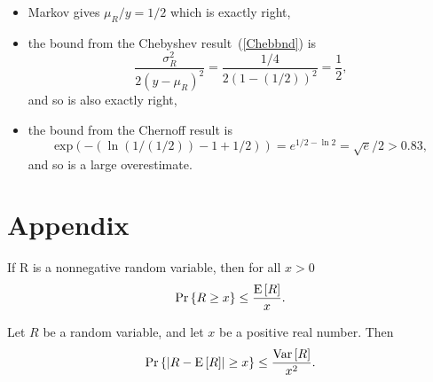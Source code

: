 \documentclass[10pt]{article}
\begin{document}
\begin{problem}
\begin{problemparts}
{\begin{itemize}
\item Markov gives $\mu_R/y = 1/2$ which is exactly right,

\item the bound from the Chebyshev result~(\ref{Chebbnd}) is
\[
\frac{\sigma_R^2}{2(y - \mu_R)^2} = \frac{1/4}{2(1-(1/2))^2} = \frac{1}{2},
\]
and so is also exactly right,

\item the bound from the Chernoff result is
\[
\text{exp}(- (\ln (1/(1/2)) - 1 + 1/2)) = e^{1/2 - \ln 2} = \sqrt{e}/2 > 0.83,
\]
and so is a large overestimate.

\end{itemize}
}

\iffalse
\problempart Discuss when the Chebyshev bound on $\pr{R > c\expect{R}}$ is
tighter than the Chernoff bound, where R is positive and $c>1$. (Providing
an example is sufficient.)

\solution{Consider the case where $c$ is small, that is, $c=1+\epsilon$
and $\epsilon < 1$.  Assume that $\variance{R}=\expect{R}=1$.  The
Chernoff bound is $e^{-(c\ln{c}-c+1)}$.  Numerical experiments show that
\[
\frac{1}{1+\epsilon^2} < e^{-(c\ln{c}-c+1)}.
\]
Therefore, the Chebyshev one-sided bound on $\pr{R>c\expect{R}}$ is
tighter than the Chernoff bound.}
\fi

\end{problemparts}
\end{problem}


%


\appendix
\section{Appendix}
\setcounter{secnumdepth}{0}


\begin{theorem*}
 If R is a nonnegative random variable, then for all $x > 0$
\begin{equation}\label{M}
\mathop{\textup{Pr}}\nolimits\left\{R \geq x\right\} \leq \frac{\mathop{\textup{E}}\nolimits\left[R\right]}{x}.
\end{equation}
\end{theorem*}

\begin{theorem*}[Chebyshev]
Let $R$ be a random variable, and let $x$ be a positive real number.
Then
\begin{equation}\label{Cheb}
\mathop{\textup{Pr}}\nolimits\left\{\left|R - \mathop{\textup{E}}\nolimits\left[R\right]\right| \geq x\right\} \leq \frac{\mathop{\textup{Var}}\nolimits\left[R\right]}{x^2}.
\end{equation}
\end{theorem*}
\end{document}
